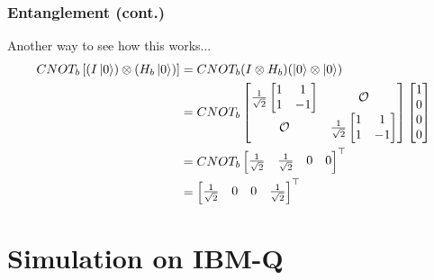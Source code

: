 \documentclass{beamer}
\theoremstyle{definition}
\begin{document}
\begin{frame}
\frametitle{Entanglement (cont.)}
Another way to see how this works...
\begin{align*}
CNOT_b\left[(I\left\vert{0}\right\rangle) \otimes (H_b\left\vert{0}\right\rangle)\right] &= CNOT_b(I \otimes H_b)(\left\vert{0}\right\rangle \otimes \left\vert{0}\right\rangle) \\
&=
CNOT_b\begin{bmatrix}
\frac{1}{\sqrt{2}}\begin{bmatrix}
1&1\\
1&-1
\end{bmatrix}& \mathcal{O}\\
\mathcal{O} & \frac{1}{\sqrt{2}}\begin{bmatrix}
1&1\\1&-1
\end{bmatrix}
\end{bmatrix}\begin{bmatrix}
1\\0\\0\\0
\end{bmatrix}\\
&= CNOT_b\begin{bmatrix}\frac{1}{\sqrt{2}} & \frac{1}{\sqrt{2}} & 0&0
\end{bmatrix}^\top \\
&= \begin{bmatrix}\frac{1}{\sqrt{2}} & 0 & 0& \frac{1}{\sqrt{2}}
\end{bmatrix}^\top
\end{align*}
\end{frame}







\section{Simulation on IBM-Q}
\end{document}
